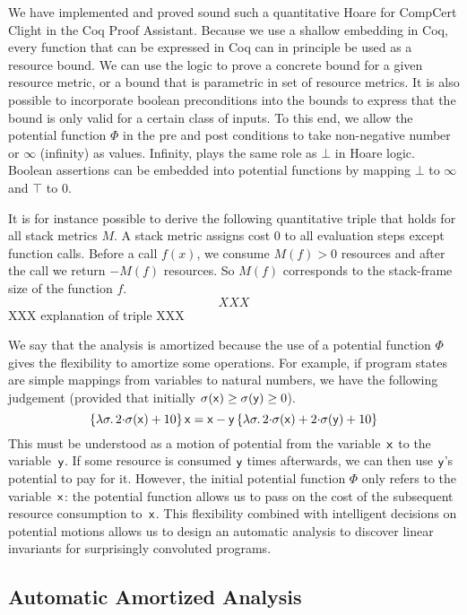\documentclass[nocopyrightspace,preprint]{sigplanconf}
\begin{document}
We have implemented and proved sound such a quantitative Hoare for
CompCert Clight in the Coq Proof Assistant.  Because we use a shallow
embedding in Coq, every function that can be expressed in Coq can in
principle be used as a resource bound.  We can use the logic to prove
a concrete bound for a given resource metric, or a bound that is
parametric in set of resource metrics.  It is also possible to
incorporate boolean preconditions into the bounds to express that the
bound is only valid for a certain class of inputs.  To this end, we
allow the potential function $\Phi$ in the pre and post conditions to
take non-negative number or $\infty$ (infinity) as values.  Infinity,
plays the same role as $\bot$ in Hoare logic.  Boolean assertions can
be embedded into potential functions by mapping $\bot$ to $\infty$ and
$\top$ to $0$.

It is for instance possible to derive the following quantitative
triple that holds for all stack metrics $M$.  A stack metric assigns
cost $0$ to all evaluation steps except function calls.  Before a call
$f(x)$, we consume $M(f) > 0$ resources and after the call we return
$-M(f)$ resources.  So $M(f)$ corresponds to the stack-frame size of
the function $f$.
$$
XXX
$$
XXX explanation of triple XXX

We say that the analysis is amortized because the use of a potential
function $\Phi$ gives the flexibility to amortize some operations.
For example, if program states are simple mappings from variables to
natural numbers, we have the following judgement (provided that
initially $\sigma(\mathsf{x}) \ge \sigma(\mathsf{y}) \ge 0$).
$$
\{\lambda \sigma . \, 2 {\cdot} \sigma (\mathsf{x}) + 10\}\, \mathsf{ x = x -  y}\, \{\lambda \sigma . \, 2 {\cdot} \sigma(\mathsf{x}) + 2 {\cdot} \sigma(\mathsf{y}) + 10\}
$$
This must be understood as a motion of potential from the
variable~$\mathsf{x}$ to the variable~$\mathsf{y}$. If some resource is
consumed $\mathsf{y}$ times afterwards, we can then use $\mathsf{y}$'s
potential to pay for it. However, the initial potential function
$\Phi$ only refers to the variable~$\mathsf{x}$: the potential function
allows us to pass on the cost of the subsequent resource consumption
to~$\mathsf{x}$.  This flexibility combined with intelligent decisions on
potential motions allows us to design an automatic analysis to
discover linear invariants for surprisingly convoluted programs.

\subsection{Automatic Amortized Analysis}
\end{document}
